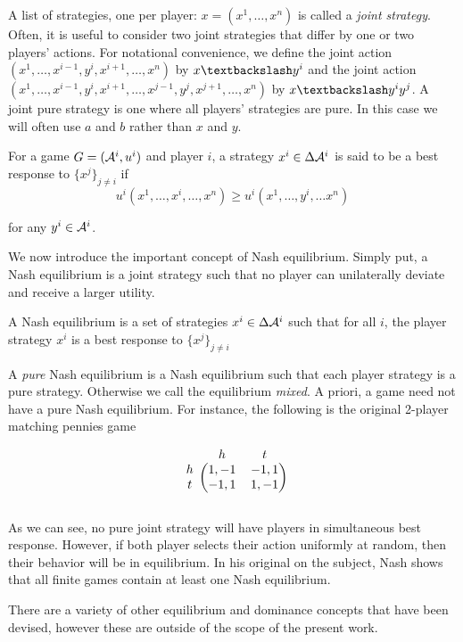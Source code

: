 A list of strategies, one per player: $x = (x^1, \ldots, x^n)$ is called a {\em joint strategy}. Often, it is useful to consider two joint strategies that differ by one or two players' actions. For notational convenience, we define the joint action $(x^1, \ldots , x^{i-1}, y^i, x^{i+1}, \ldots, x^n)$ by $\asub{x}{y^i}$ and the joint action $(x^1, \ldots , x^{i-1}, y^i, x^{i+1}, \ldots, x^{j-1}, y^j, x^{j+1}, \ldots,  x^n)$ by $\asub{x}{y^iy^j}$. A joint pure strategy is one where all players' strategies are pure. In this case we will often use $a$ and $b$ rather than $x$ and $y$.


\begin{mydef}
For a game $G = (\AA^i, u^i)$ and player $i$, a strategy $x^i \in \Delta \AA^i$ is said to be a best response to $\{x^j\}_{j \neq i}$ if
$$
u^i(x^1, \ldots, x^i, \ldots, x^n) \geq u^i(x^1, \ldots, y^i, \ldots x^n)
$$

for any $y^i \in \AA^i$.

\end{mydef}


We now introduce the important concept of Nash equilibrium. Simply put, a Nash equilibrium is a joint strategy such that no player can unilaterally deviate and receive a larger utility.

\begin{mydef}
A Nash equilibrium is a set of strategies $x^i \in \Delta \AA^i$ such that for all $i$, the player strategy $x^i$ is a best response to $\{x^j\}_{j \neq i}$
\end{mydef}

A {\em pure} Nash equilibrium is a Nash equilibrium such that each player strategy is a pure strategy. Otherwise we call the equilibrium {\em mixed}. A priori, a game need not have a pure Nash equilibrium. For instance, the following is the original 2-player matching pennies game

\begin{equation}

\begin{blockarray}{ccc}
 & h & t \\
\begin{block}{c(cc)}
  h & 1,-1 & -1,1 \\
  t & -1,1 & 1,-1 \\
\end{block}
\end{blockarray} 

\label{matchpen2}
\end{equation}

As we can see, no pure joint strategy will have players in simultaneous best response. However, if both player selects their action uniformly at random, then their behavior will be in equilibrium. In his original on the subject, Nash shows that all finite games contain at least one Nash equilibrium. 

There are a variety of other equilibrium and dominance concepts that have been devised, however these are outside of the scope of the present work. 
